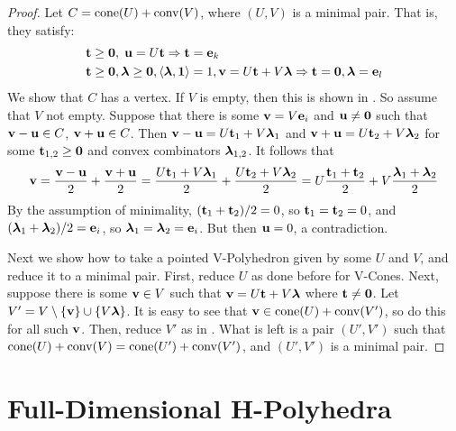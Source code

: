 \begin{proof}
	Let $C=\operatorname{cone}(U) + \operatorname{conv}(V)$, where $(U,V)$ is a minimal pair.  That is, they satisfy:
	\begin{alignat*}{1}
		 & \mathbf{t} \geq \mathbf{0},\; \mathbf{u} = U\mathbf{t} \Rightarrow \mathbf{t} = \mathbf{e}_k                              \\
		 & \mathbf{t} \geq \mathbf{0}, \bm{\lambda} \geq \mathbf{0}, \left\langle \bm{\lambda}, \mathbf{1} \right\rangle = 1, \mathbf{v} = U\mathbf{t} + V\bm{\lambda}
		\Rightarrow \mathbf{t} = \mathbf{0}, \bm{\lambda} = \mathbf{e}_l
	\end{alignat*}
	We show that $C$ has a vertex.  If $V$ is empty, then this is shown in .  So assume that $V$ not empty.  Suppose that there is some $\mathbf{v}=V\mathbf{e}_i$ and $\mathbf{u}\neq\mathbf{0}$ such that $\mathbf{v}-\mathbf{u}\in C$, $\mathbf{v}+\mathbf{u}\in C$.  Then $\mathbf{v}-\mathbf{u}=U\mathbf{t}_1+V\bm{\lambda}_1$ and $\mathbf{v}+\mathbf{u}=U\mathbf{t}_2+V\bm{\lambda}_2$ for some $\mathbf{t}_{1,2}\geq \mathbf{0}$ and convex combinators $\bm{\lambda}_{1,2}$.  It follows that
  \[\mathbf{v} = \frac{\mathbf{v}-\mathbf{u}}{2}+\frac{\mathbf{v}+\mathbf{u}}{2} = \frac{U\mathbf{t}_1+V\bm{\lambda}_1}{2} + \frac{U\mathbf{t}_2+V\bm{\lambda}_2}{2}
       = U\frac{\mathbf{t}_1+\mathbf{t}_2}{2}+V\frac{\bm{\lambda}_1+\bm{\lambda}_2}{2} \]
  By the assumption of minimality, $(\mathbf{t}_1+\mathbf{t}_2)/2 = 0$, so $\mathbf{t}_1=\mathbf{t}_2=0$, and $(\bm{\lambda}_1 + \bm{\lambda}_2)/2 = \mathbf{e}_i$, so $\bm{\lambda}_1=\bm{\lambda}_2=\mathbf{e}_i$.  But then $\mathbf{u}=0$, a contradiction.

  Next we show how to take a pointed V-Polyhedron given by some $U$ and $V$, and reduce it to a minimal pair.  First, reduce $U$ as done before for V-Cones.  Next, suppose there is some $\mathbf{v}\in V$ such that $\mathbf{v}=U\mathbf{t} + V\bm{\lambda}$ where $\mathbf{t}\neq\mathbf{0}$.  Let $V'=V\setminus\{\mathbf{v}\}\cup\{V\bm{\lambda}\}$.  It is easy to see that $\mathbf{v}\in\operatorname{cone}(U) + \operatorname{conv}(V')$, so do this for all such $\mathbf{v}$.  Then, reduce $V'$ as in .  What is left is a pair $(U',V')$ such that $\operatorname{cone}(U) + \operatorname{conv}(V) = \operatorname{cone}(U') + \operatorname{conv}(V')$, and $(U',V')$ is a minimal pair.
\end{proof}

\section{Full-Dimensional H-Polyhedra}

